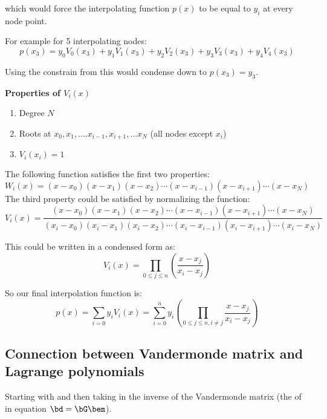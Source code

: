 \documentclass[11pt,titlepage,fleqn]{article}
\begin{document}
which would force the interpolating function $p(x)$ to be equal to $y_i$ at every node point.

For example for 5 interpolating nodes:
\begin{equation}
p(x_3) = y_0V_0(x_3) + y_1V_1(x_3) + y_2V_2(x_3) + y_3V_3(x_3) + y_4V_4(x_3)
\end{equation}

Using the constrain from  this would condense down to $p(x_3) = y_3$.
\linebreak

{\bf Properties of $V_i(x)$}
\begin{enumerate}
\item Degree $N$
\item Roots at $x_0, x_1,....x_{i-1}, x_{i+1},...x_N$ (all nodes except $x_i$)
\item $V_i(x_i) = 1$
\end{enumerate}

The following function satisfies the first two properties:
\begin{equation}
W_i(x) = (x-x_0) (x-x_1)(x-x_2) \cdots (x-x_{i-1})(x-x_{i+1})\cdots(x-x_N)
\end{equation}
The third property could be satisfied by normalizing the function:
\begin{equation}
V_i(x) = \frac{(x-x_0) (x-x_1)(x-x_2) \cdots (x-x_{i-1})(x-x_{i+1})\cdots(x-x_N)}{(x_i-x_0) (x_i-x_1)(x_i-x_2) \cdots (x_i-x_{i-1})(x_i-x_{i+1})\cdots(x_i-x_N)}
\end{equation}

This could be written in a condensed form as:
\begin{equation}
V_i(x) = \prod_{0\leq j\leq n} \left (\frac{x-x_j}{x_i -x _j} \right )
\end{equation}

So our final interpolation function is:
\begin{equation}
p(x) = \sum_{i=0} y_i V_i(x) = \sum_{i=0}^n y_i \left (\prod_{0\leq j\leq n, i\neq j} \frac{x-x_j}{x_i -x _j} \right )
\end{equation}

\subsection{Connection between Vandermonde matrix and Lagrange polynomials}

Starting with  and then taking in the inverse of the Vandermonde matrix (the \bG of in equation $\bd = \bG \bem$).
\end{document}
